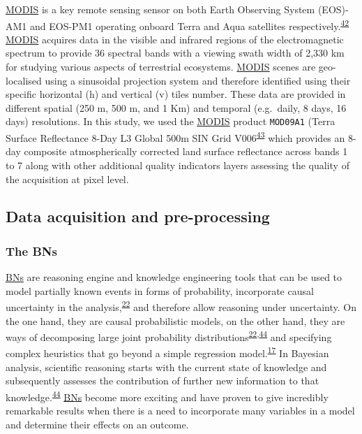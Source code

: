\documentclass[12pt,oneside]{article}
\begin{document}
\href{https://terra.nasa.gov/about/terra-instruments/modis}{MODIS} is a key remote sensing sensor on both Earth Observing System (EOS)-AM1 and EOS-PM1 operating onboard Terra and Aqua satellites respectively.\textsuperscript{\protect\hyperlink{ref-King_et_al_1995}{42}} \href{https://terra.nasa.gov/about/terra-instruments/modis}{MODIS} acquires data in the visible and infrared regions of the electromagnetic spectrum to provide 36 spectral bands with a viewing swath width of 2,330 km for studying various aspects of terrestrial ecosystems. \href{https://terra.nasa.gov/about/terra-instruments/modis}{MODIS} scenes are geo-localised using a sinusoidal projection system and therefore identified using their specific horizontal (h) and vertical (v) tiles number. These data are provided in different spatial (250 m, 500 m, and 1 Km) and temporal (e.g.~daily, 8 days, 16 days) resolutions. In this study, we used the \href{https://terra.nasa.gov/about/terra-instruments/modis}{MODIS} product \texttt{MOD09A1} (Terra Surface Reflectance 8-Day L3 Global 500m SIN Grid V006\textsuperscript{\protect\hyperlink{ref-Vermote_2015}{43}} which provides an 8-day composite atmospherically corrected land surface reflectance across bands 1 to 7 along with other additional quality indicators layers assessing the quality of the acquisition at pixel level.

\hypertarget{I3}{%
\subsection{Data acquisition and pre-processing}\label{I3}}

\hypertarget{I31}{%
\subsubsection{The BNs}\label{I31}}

\href{https://en.wikipedia.org/wiki/Bayesian_network}{BNs} are reasoning engine and knowledge engineering tools that can be used to model partially known events in forms of probability, incorporate causal uncertainty in the analysis,\textsuperscript{\protect\hyperlink{ref-Pourret_et_al_2008}{22}} and therefore allow reasoning under uncertainty. On the one hand, they are causal probabilistic models, on the other hand, they are ways of decomposing large joint probability distributions\textsuperscript{\protect\hyperlink{ref-Pourret_et_al_2008}{22},\protect\hyperlink{ref-Pearl_2000}{44}} and specifying complex heuristics that go beyond a simple regression model.\textsuperscript{\protect\hyperlink{ref-Whitney_et_al_2018}{17}} In Bayesian analysis, scientific reasoning starts with the current state of knowledge and subsequently assesses the contribution of further new information to that knowledge.\textsuperscript{\protect\hyperlink{ref-Pearl_2000}{44}} \href{https://en.wikipedia.org/wiki/Bayesian_network}{BNs} become more exciting and have proven to give incredibly remarkable results when there is a need to incorporate many variables in a model and determine their effects on an outcome.
\end{document}
